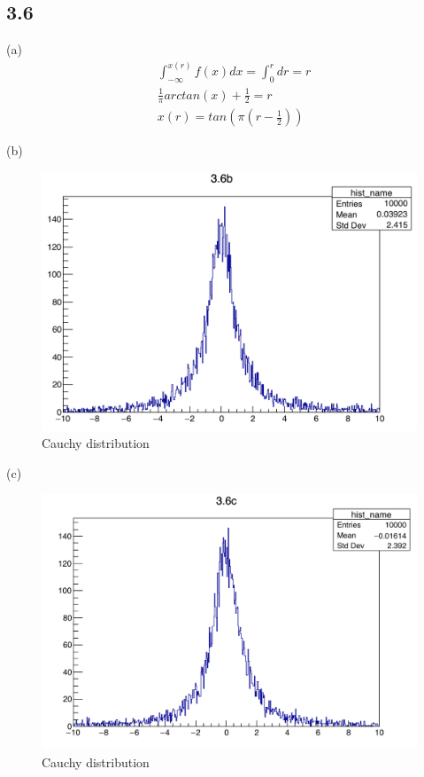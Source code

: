 \documentclass{article}
\begin{document}
\begin{CJK*}{GBK}{song}
\section{3.6}
(a)
\begin{equation}
\begin{aligned}
&\int_{-\infty}^{x(r)}f(x)dx=\int_0^rdr=r\\
&\frac{1}{\pi}arctan(x)+\frac{1}{2}=r\\
&x(r)=tan(\pi(r-\frac{1}{2}))
\end{aligned}
\end{equation}

(b)
\begin{figure}[H]
\centerline{\includegraphics[scale=0.4]{3.6b.png}}
\caption{Cauchy distribution}
\label{fig:label}
\end{figure}

(c)
\begin{figure}[H]
\centerline{\includegraphics[scale=0.4]{3.6c.png}}
\caption{Cauchy distribution}
\label{fig:label}
\end{figure}








\end{CJK*}
\end{document}
